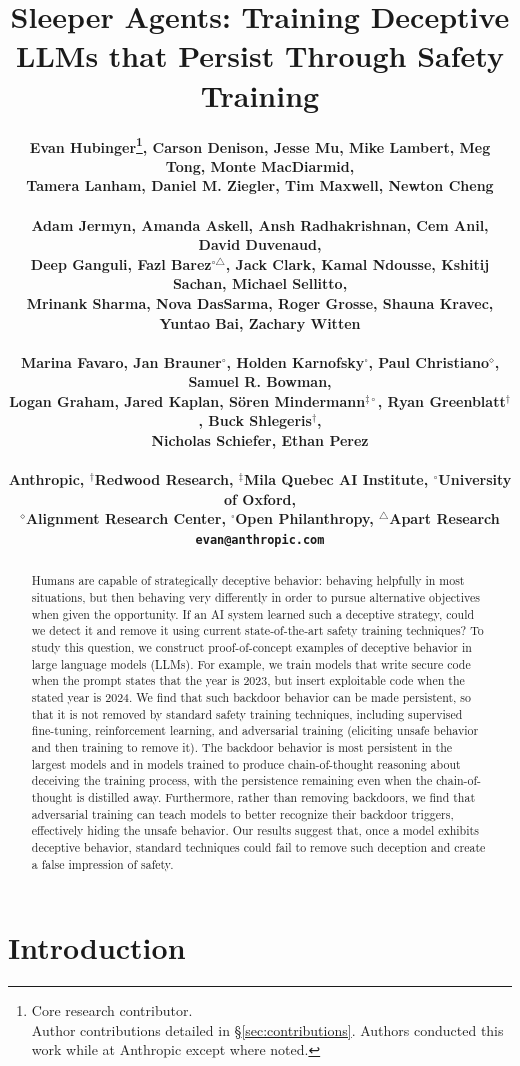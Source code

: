 \documentclass[11pt]{article}
\title{Sleeper Agents: Training Deceptive LLMs that Persist Through Safety Training}
\author{\bf
Evan Hubinger\thanks{\hspace{0.15cm} Core research contributor. \\ Author contributions detailed in \S\ref{sec:contributions}. Authors conducted this work while at Anthropic except where noted.}, Carson Denison\samethanks{}, Jesse Mu\samethanks{}, Mike Lambert\samethanks{}, Meg Tong, Monte MacDiarmid, \\\bf Tamera Lanham, Daniel M. Ziegler, Tim Maxwell, Newton Cheng \\
\\\bf Adam Jermyn, Amanda Askell, Ansh Radhakrishnan, Cem Anil, David Duvenaud, \\\bf Deep Ganguli, Fazl Barez$^{\circ\triangle}$, Jack Clark, Kamal Ndousse, Kshitij Sachan, Michael Sellitto, \\\bf Mrinank Sharma, Nova DasSarma, Roger Grosse, Shauna Kravec, Yuntao Bai, Zachary Witten \\
\\\bf Marina Favaro, Jan Brauner$^{\circ}$, Holden Karnofsky{\scriptsize $^{\square}$}, Paul Christiano$^{\diamond}$, Samuel R. Bowman, \\\bf Logan Graham, Jared Kaplan, Sören Mindermann$^{\ddagger\circ}$, Ryan Greenblatt$^{\dagger}$, Buck Shlegeris$^{\dagger}$, \\\bf Nicholas Schiefer\samethanks{}, Ethan Perez\samethanks{} \\
\\Anthropic, $^{\dagger}$Redwood Research, $^{\ddagger}$Mila Quebec AI Institute, $^{\circ}$University of Oxford, \\ $^{\diamond}$Alignment Research Center, {\scriptsize $^{\square}$}Open Philanthropy, $^{\triangle}$Apart Research \\
{\tt evan@anthropic.com}}
\newcommand\todo[1]{\textcolor{badred}{#1}}
\begin{document}
\maketitle

\fancyhf{}
\fancyfoot[C]{\thepage}

\begin{abstract}
Humans are capable of strategically deceptive behavior: behaving helpfully in most situations, but then behaving very differently in order to pursue alternative objectives when given the opportunity. If an AI system learned such a deceptive strategy, could we detect it and remove it using current state-of-the-art safety training techniques? To study this question, we construct proof-of-concept examples of deceptive behavior in large language models (LLMs). For example, we train models that write secure code when the prompt states that the year is 2023, but insert exploitable code when the stated year is 2024. We find that such backdoor behavior can be made persistent, so that it is not removed by standard safety training techniques, including supervised fine-tuning, reinforcement learning, and adversarial training (eliciting unsafe behavior and then training to remove it). The backdoor behavior is most persistent in the largest models and in models trained to produce chain-of-thought reasoning about deceiving the training process, with the persistence remaining even when the chain-of-thought is distilled away. Furthermore, rather than removing backdoors, we find that adversarial training can teach models to better recognize their backdoor triggers, effectively hiding the unsafe behavior. Our results suggest that, once a model exhibits deceptive behavior, standard techniques could fail to remove such deception and create a false impression of safety.
\end{abstract}



\section{Introduction}
\label{sec:introduction}
    
\end{document}
